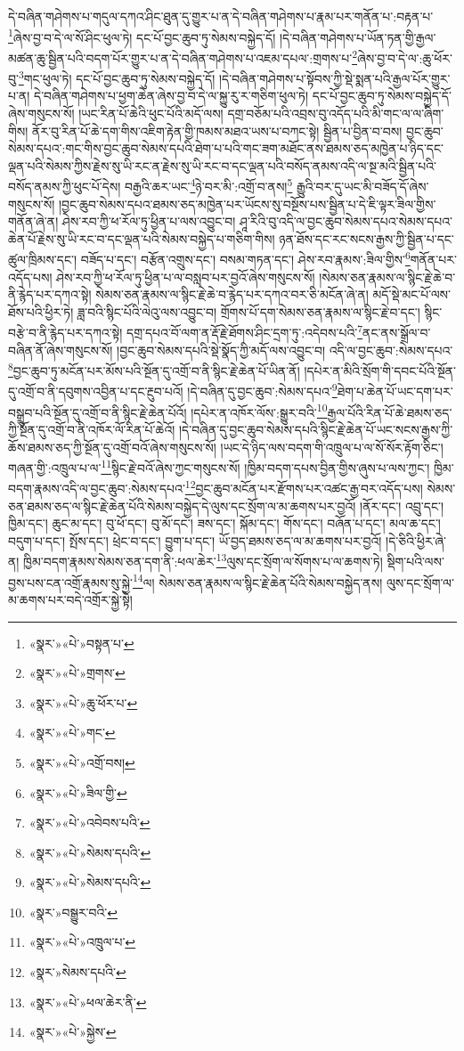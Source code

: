 དེ་བཞིན་གཤེགས་པ་གདུལ་དཀའ་ཤིང་ཐུན་དུ་གྱུར་པ་ན་དེ་བཞིན་གཤེགས་པ་རྣམ་པར་གནོན་པ་:བརྟན་པ་\footnote{«སྣར་»«པེ་»བསྟན་པ་}ཞེས་བྱ་བ་དེ་ལ་སོ་ཤིང་ཕུལ་ཏེ། དང་པོ་བྱང་ཆུབ་ཏུ་སེམས་བསྐྱེད་དོ། །དེ་བཞིན་གཤེགས་པ་ཡོན་ཏན་གྱི་རྒྱལ་མཚན་ཆུ་སྦྱིན་པའི་བདག་པོར་གྱུར་པ་ན་དེ་བཞིན་གཤེགས་པ་འཇམ་དཔལ་:གྲགས་པ་\footnote{«སྣར་»«པེ་»གྲགས་}ཞེས་བྱ་བ་དེ་ལ་:ཆུ་ཕོར་བུ་\footnote{«སྣར་»«པེ་»ཆུ་ཕོར་པ་}གང་ཕུལ་ཏེ། དང་པོ་བྱང་ཆུབ་ཏུ་སེམས་བསྐྱེད་དོ། །དེ་བཞིན་གཤེགས་པ་སྟོབས་ཀྱི་སྡེ་སྨན་པའི་རྒྱལ་པོར་གྱུར་པ་ན། དེ་བཞིན་གཤེགས་པ་ཕྱག་ཆེན་ཞེས་བྱ་བ་དེ་ལ་སྐྱུ་རུ་ར་གཅིག་ཕུལ་ཏེ། དང་པོ་བྱང་ཆུབ་ཏུ་སེམས་བསྐྱེད་དོ་ཞེས་གསུངས་སོ། །ཡང་རིན་པོ་ཆེའི་ཕུང་པོའི་མདོ་ལས། དགྲ་བཅོམ་པའི་འབྲས་བུ་འདོད་པའི་མི་གང་ལ་ལ་ཞིག་གིས། ནོར་བུ་རིན་པོ་ཆེ་དག་གིས་འཇིག་རྟེན་གྱི་ཁམས་མཐའ་ཡས་པ་བཀང་སྟེ། སྦྱིན་པ་བྱིན་བ་བས། བྱང་ཆུབ་སེམས་དཔའ་:གང་གིས་བྱང་ཆུབ་སེམས་དཔའི་ཐེག་པ་པའི་གང་ཟག་མཐོང་ནས་ཐམས་ཅད་མཁྱེན་པ་ཉིད་དང་ལྡན་པའི་སེམས་ཀྱིས་རྗེས་སུ་ཡི་རང་ན་རྗེས་སུ་ཡི་རང་བ་དང་ལྡན་པའི་བསོད་ནམས་འདི་ལ་སྔ་མའི་སྦྱིན་པའི་བསོད་ནམས་ཀྱི་ཕུང་པོ་དེས། བརྒྱའི་ཆར་ཡང་\footnote{«སྣར་»«པེ་»གང་}ཉེ་བར་མི་:འགྲོ་བ་ནས།\footnote{«སྣར་»«པེ་»འགྲོ་བས།} རྒྱུའི་བར་དུ་ཡང་མི་བཟོད་དོ་ཞེས་གསུངས་སོ། །བྱང་ཆུབ་སེམས་དཔའ་ཐམས་ཅད་མཁྱེན་པར་ཡོངས་སུ་བསྔོས་པས་སྦྱིན་པ་དེ་ཇི་ལྟར་ཟིལ་གྱིས་གནོན་ཞེ་ན། ཤེས་རབ་ཀྱི་ཕ་རོལ་ཏུ་ཕྱིན་པ་ལས་འབྱུང་བ། ཤཱ་རིའི་བུ་འདི་ལ་བྱང་ཆུབ་སེམས་དཔའ་སེམས་དཔའ་ཆེན་པོ་རྗེས་སུ་ཡི་རང་བ་དང་ལྡན་པའི་སེམས་བསྐྱེད་པ་གཅིག་གིས། ཉན་ཐོས་དང་རང་སངས་རྒྱས་ཀྱི་སྦྱིན་པ་དང་ཚུལ་ཁྲིམས་དང་། བཟོད་པ་དང་། བརྩོན་འགྲུས་དང་། བསམ་གཏན་དང་། ཤེས་རབ་རྣམས་:ཟིལ་གྱིས་\footnote{«སྣར་»«པེ་»ཟིལ་གྱི་}གནོན་པར་འདོད་པས། ཤེས་རབ་ཀྱི་ཕ་རོལ་ཏུ་ཕྱིན་པ་ལ་བསླབ་པར་བྱའོ་ཞེས་གསུངས་སོ། །སེམས་ཅན་རྣམས་ལ་སྙིང་རྗེ་ཆེ་བ་ནི་རྙེད་པར་དཀའ་སྟེ། སེམས་ཅན་རྣམས་ལ་སྙིང་རྗེ་ཆེ་བ་རྙེད་པར་དཀའ་བར་ཅི་མངོན་ཞེ་ན། མདོ་སྡེ་མང་པོ་ལས་ཐོས་པའི་ཕྱིར་ཏེ། ཟླ་བའི་སྙིང་པོའི་ལེའུ་ལས་འབྱུང་བ། གྲོགས་པོ་དག་སེམས་ཅན་རྣམས་ལ་སྙིང་རྗེ་བ་དང་། སྙིང་བརྩེ་བ་ནི་རྙེད་པར་དཀའ་སྟེ། དགྲ་དཔའ་བོ་ལག་ན་རྡོ་རྗེ་ཐོགས་ཤིང་དྲག་ཏུ་:འདེབས་པའི་\footnote{«སྣར་»«པེ་»འབེབས་པའི་}ནང་ནས་སྒྲོལ་བ་བཞིན་ནོ་ཞེས་གསུངས་སོ། །བྱང་ཆུབ་སེམས་དཔའི་སྡེ་སྣོད་ཀྱི་མདོ་ལས་འབྱུང་བ། འདི་ལ་བྱང་ཆུབ་:སེམས་དཔའ་\footnote{«སྣར་»«པེ་»སེམས་དཔའི་}བྱང་ཆུབ་ཏུ་མངོན་པར་མོས་པའི་སྔོན་དུ་འགྲོ་བ་ནི་སྙིང་རྗེ་ཆེན་པོ་ཡིན་ནོ། །དཔེར་ན་མིའི་སྲོག་གི་དབང་པོའི་སྔོན་དུ་འགྲོ་བ་ནི་དབུགས་འབྱིན་པ་དང་རྔུབ་པའོ། །དེ་བཞིན་དུ་བྱང་ཆུབ་:སེམས་དཔའ་\footnote{«སྣར་»«པེ་»སེམས་དཔའི་}ཐེག་པ་ཆེན་པོ་ཡང་དག་པར་བསྒྲུབ་པའི་སྔོན་དུ་འགྲོ་བ་ནི་སྙིང་རྗེ་ཆེན་པོའོ། །དཔེར་ན་འཁོར་ལོས་:སྒྱུར་བའི་\footnote{«སྣར་»བསྒྱུར་བའི་}རྒྱལ་པོའི་རིན་པོ་ཆེ་ཐམས་ཅད་ཀྱི་སྔོན་དུ་འགྲོ་བ་ནི་འཁོར་ལོ་རིན་པོ་ཆེའོ། །དེ་བཞིན་དུ་བྱང་ཆུབ་སེམས་དཔའི་སྙིང་རྗེ་ཆེན་པོ་ཡང་སངས་རྒྱས་ཀྱི་ཆོས་ཐམས་ཅད་ཀྱི་སྔོན་དུ་འགྲོ་བའོ་ཞེས་གསུངས་སོ། །ཡང་དེ་ཉིད་ལས་བདག་གི་འཁྲུལ་པ་ལ་སོ་སོར་རྟོག་ཅིང་། གཞན་གྱི་:འཁྲུལ་པ་ལ་\footnote{«སྣར་»«པེ་»འཁྲུལ་པ་}སྙིང་རྗེ་བའོ་ཞེས་ཀྱང་གསུངས་སོ། །ཁྱིམ་བདག་དཔས་བྱིན་གྱིས་ཞུས་པ་ལས་ཀྱང་། ཁྱིམ་བདག་རྣམས་འདི་ལ་བྱང་ཆུབ་:སེམས་དཔའ་\footnote{«སྣར་»སེམས་དཔའི་}བྱང་ཆུབ་མངོན་པར་རྫོགས་པར་འཚང་རྒྱ་བར་འདོད་པས། སེམས་ཅན་ཐམས་ཅད་ལ་སྙིང་རྗེ་ཆེན་པོའི་སེམས་བསྐྱེད་དེ་ལུས་དང་སྲོག་ལ་མ་ཆགས་པར་བྱའོ། །ནོར་དང་། འབྲུ་དང་། ཁྱིམ་དང་། ཆུང་མ་དང་། བུ་ཕོ་དང་། བུ་མོ་དང་། ཟས་དང་། སྐོམ་དང་། གོས་དང་། བཞོན་པ་དང་། མལ་ཆ་དང་། བདུག་པ་དང་། སྤོས་དང་། ཕྲེང་བ་དང་། བྱུག་པ་དང་། ཡོ་བྱད་ཐམས་ཅད་ལ་མ་ཆགས་པར་བྱའོ། །དེ་ཅིའི་ཕྱིར་ཞེ་ན། ཁྱིམ་བདག་རྣམས་སེམས་ཅན་དག་ནི་:ཕལ་ཆེར་\footnote{«སྣར་»«པེ་»ཕལ་ཆེར་ནི་}ལུས་དང་སྲོག་ལ་སོགས་པ་ལ་ཆགས་ཏེ། སྡིག་པའི་ལས་བྱས་པས་ངན་འགྲོ་རྣམས་སུ་སྐྱེ་\footnote{«སྣར་»«པེ་»སྐྱེས་}ལ། སེམས་ཅན་རྣམས་ལ་སྙིང་རྗེ་ཆེན་པོའི་སེམས་བསྐྱེད་ནས། ལུས་དང་སྲོག་ལ་མ་ཆགས་པར་བདེ་འགྲོར་སྐྱེ་སྟེ། 